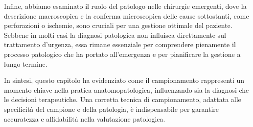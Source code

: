 Infine, abbiamo esaminato il ruolo del patologo nelle chirurgie emergenti, dove la descrizione macroscopica e la conferma microscopica delle cause sottostanti, come perforazioni o ischemie, sono cruciali per una gestione ottimale del paziente. Sebbene in molti casi la diagnosi patologica non influisca direttamente sul trattamento d’urgenza, essa rimane essenziale per comprendere pienamente il processo patologico che ha portato all’emergenza e per pianificare la gestione a lungo termine.

In sintesi, questo capitolo ha evidenziato come il campionamento rappresenti un momento chiave nella pratica anatomopatologica, influenzando sia la diagnosi che le decisioni terapeutiche. Una corretta tecnica di campionamento, adattata alle specificità del campione e della patologia, è indispensabile per garantire accuratezza e affidabilità nella valutazione patologica.

